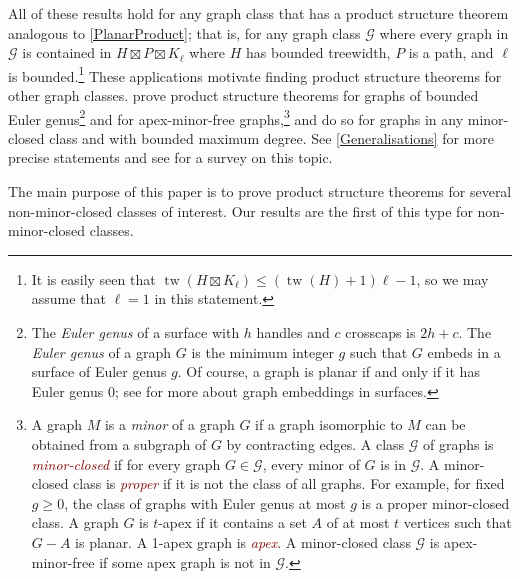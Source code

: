 \documentclass{patmorin}
\theoremstyle{plain}
\theoremstyle{definition}
\newcommand{\defin}[1]{\textcolor{Maroon}{\emph{#1}}}
\newcommand{\note}[2]{\noindent{\color{red}[#1:~#2]}}
\DeclareMathOperator{\tw}{tw}
\renewcommand{\geq}{\geqslant}
\renewcommand{\leq}{\leqslant}
\begin{document}


All of these results hold for any graph class that has a product structure theorem analogous to \cref{PlanarProduct}; that is, for any graph class  $\mathcal{G}$ where every graph in $\mathcal{G}$ is contained in $H\boxtimes P\boxtimes K_\ell$ where $H$ has bounded treewidth, $P$ is a path, and $\ell$ is bounded.\footnote{It is easily seen that $\tw(H\boxtimes K_\ell) \leq (\tw(H)+1)\ell-1$, so we may assume that $\ell=1$ in this statement.} These applications motivate finding product structure theorems for other graph classes. \citet{DJMMUW20} prove product structure theorems for graphs of bounded Euler genus\footnote{The \textit{Euler genus} of a surface with $h$ handles and $c$ crosscaps is $2h+c$. The \textit{Euler genus} of a graph $G$ is the minimum integer $g$ such that $G$ embeds in a surface of Euler genus $g$. Of course, a graph is planar if and only if it has Euler genus 0; see \citep{mohar.thomassen:graphs} for more about graph embeddings in surfaces.} and for apex-minor-free graphs,\footnote{A graph $M$ is a \textit{minor} of a graph $G$ if a graph isomorphic to $M$ can be obtained from a subgraph of $G$ by contracting edges. A class $\mathcal{G}$ of graphs is \defin{minor-closed} if for every graph $G\in\mathcal{G}$, every minor of $G$ is in $\mathcal{G}$. A minor-closed class is \defin{proper} if it is not the class of all graphs. For example, for fixed $g\geq 0$, the class of graphs with Euler genus at most $g$ is a proper minor-closed class. A graph $G$ is $t$-apex if it contains a set $A$ of at most $t$ vertices such that $G-A$ is planar. A 1-apex graph is \defin{apex}.  A minor-closed class $\mathcal{G}$ is apex-minor-free if some apex graph is not in $\mathcal{G}$.} and \citet{DEMWW22} do so for graphs in any minor-closed class and with bounded maximum degree. See \cref{Generalisations} for more precise statements and see \citep{DHJLW21} for a survey on this topic.

The main purpose of this paper is to prove product structure theorems for several non-minor-closed classes of interest. Our results are the first of this type for non-minor-closed classes.
\end{document}
